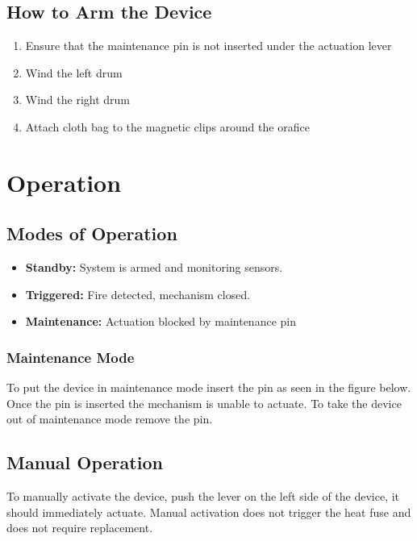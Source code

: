 \documentclass[12pt, a4paper]{report}
\begin{document}
\section{How to Arm the Device}
    \begin{enumerate}
        \item Ensure that the maintenance pin is not inserted under the actuation lever
        \item Wind the left drum
        \item Wind the right drum
        \item Attach cloth bag to the magnetic clips around the orafice
    \end{enumerate}

\chapter{Operation}

\section{Modes of Operation}
    \begin{itemize}
        \item \textbf{Standby:} System is armed and monitoring sensors.
        \item \textbf{Triggered:} Fire detected, mechanism closed.
        \item \textbf{Maintenance:} Actuation blocked by maintenance pin
    \end{itemize}
    
\subsection{Maintenance Mode}
To put the device in maintenance mode insert the pin as seen in the figure below. Once the pin is inserted the mechanism is unable to actuate. To take the device out of maintenance mode remove the pin.


\section{Manual Operation}
To manually activate the device, push the lever on the left side of the device, it should immediately actuate. Manual activation does not trigger the heat fuse and does not require replacement. 
\end{document}
